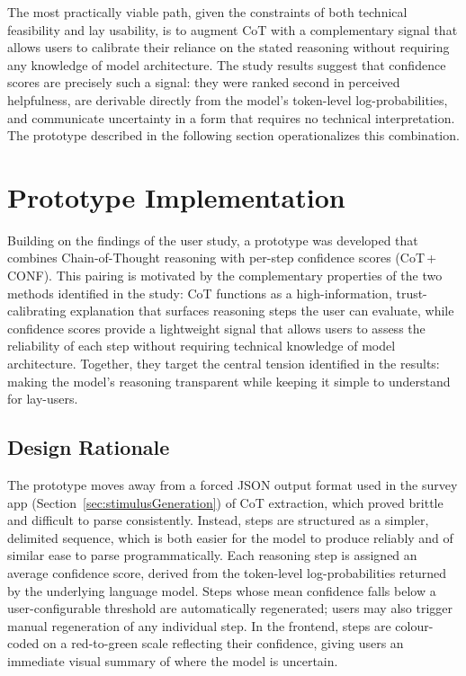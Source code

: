 The most practically viable path, given the constraints of both technical feasibility and lay
usability, is to augment CoT with a complementary signal that allows users to calibrate their
reliance on the stated reasoning without requiring any knowledge of model architecture. The
study results suggest that confidence scores are precisely such a signal: they were ranked
second in perceived helpfulness, are derivable directly from the model's token-level
log-probabilities, and communicate uncertainty in a form that requires no technical
interpretation. The prototype described in the following section operationalizes this
combination.

\section{Prototype Implementation}
\label{sec:prototype}
 
Building on the findings of the user study, a prototype was developed that combines
Chain-of-Thought reasoning with per-step confidence scores (CoT\,+\,CONF). This pairing
is motivated by the complementary properties of the two methods identified in the study:
CoT functions as a high-information, trust-calibrating explanation that surfaces reasoning
steps the user can evaluate, while confidence scores provide a lightweight signal that
allows users to assess the reliability of each step without requiring technical knowledge
of model architecture. Together, they target the central tension identified in the results:
making the model's reasoning transparent while keeping it simple to understand for lay-users.
 
\subsection{Design Rationale}
 
The prototype moves away from a forced JSON output format used in the survey app (Section~\ref{sec:stimulusGeneration}) of CoT extraction, which proved brittle and difficult to parse consistently. Instead, steps are structured as a simpler, delimited sequence, which is both easier for the model to produce reliably and of similar ease to parse programmatically. Each reasoning step is assigned an
average confidence score, derived from the token-level log-probabilities returned by the
underlying language model. Steps whose mean confidence falls below a user-configurable
threshold are automatically regenerated; users may also trigger manual regeneration of
any individual step. In the frontend, steps are colour-coded on a red-to-green scale
reflecting their confidence, giving users an immediate visual summary of where the model
is uncertain.
 

